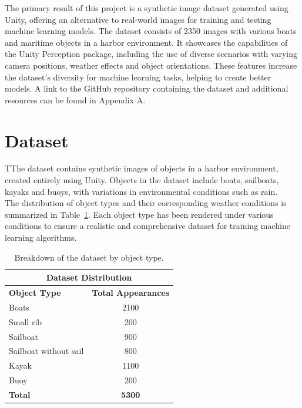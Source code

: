 The primary result of this project is a synthetic image dataset generated using Unity, offering an alternative to real-world images for training and testing machine learning models. The dataset consists of 2350 images with various boats and maritime objects in a harbor environment. It showcases the capabilities of the Unity Perception package, including the use of diverse scenarios with varying camera positions, weather effects and object orientations. These features increase the dataset's diversity for machine learning tasks, helping to create better models. A link to the GitHub repository containing the dataset and additional resources can be found in Appendix A.

\section{Dataset}
TThe dataset contains synthetic images of objects in a harbor environment, created entirely using Unity. Objects in the dataset include boats, sailboats, kayaks and buoys, with variations in environmental conditions such as rain.\\

\noindent The distribution of object types and their corresponding weather conditions is summarized in Table~\ref{tab:dataset_composition}. Each object type has been rendered under various conditions to ensure a realistic and comprehensive dataset for training machine learning algorithms.
 
\begin{table}[H]
\centering
\begin{tabular}{|l|c|}
\hline
\multicolumn{2}{|c|}{\textbf{Dataset Distribution}} \\ 
\hline
\textbf{Object Type} & \textbf{Total Appearances}\\ 
\hline
Boats         & 2100  \\ 
Small rib     & 200 \\
Sailboat      & 900     \\
Sailboat without sail     & 800    \\
Kayak        & 1100     \\ 
Buoy         & 200     \\ 

\hline
\textbf{Total}       & \textbf{5300} \\ 
\hline
\end{tabular}
\caption{Breakdown of the dataset by object type.}
\label{tab:dataset_composition}
\end{table}



